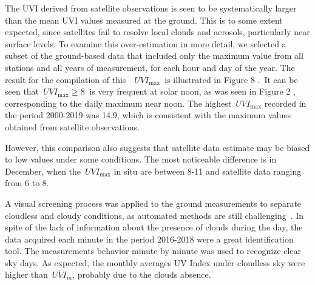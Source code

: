 \documentclass{article}
\begin{document}
The UVI derived from satellite observations is seen to be systematically
larger than the mean UVI values measured at the ground. This is to some
extent expected, since satellites fail to resolve local clouds and
aerosols, particularly near surface levels. To examine this
over-estimation in more detail, we selected a subset of the ground-based
data that included only the maximum value from all stations and all
years of measurement, for each hour and day of the year. The result for
the compilation of this~~\(UVI_{\max}\)~is illustrated in
Figure 8 %
.~It can be seen
that~\(UVI_{\max}\ge8\ \) is very frequent at solar noon, as was seen in
Figure 2%
, corresponding to the daily
maximum near noon. The highest~\(UVI_{\max}\) recorded in the period
2000-2019 was 14.9, which is consistent with the maximum values obtained
from satellite observations.

However, this comparison also suggests that satellite data estimate may
be biased to low values under some conditions. The most noticeable
difference is in December, when the~\(UVI_{\max}\) in situ are
between 8-11 and satellite data ranging from 6 to 8.~

A visual screening process was applied to the ground measurements to
separate cloudless and cloudy conditions, as automated methods are still
challenging~\cite{Badosa2014,Wild2019}. In spite of the lack of information
about the presence of clouds during the day, the data acquired each
minute in the period 2016-2018 were a great identification tool. The
measurements behavior minute by minute was used to recognize clear sky
days. As expected, the monthly averages UV Index under cloudless sky
were higher than~\(\overline{UVI}_m\), probably due to the clouds absence.
\end{document}
